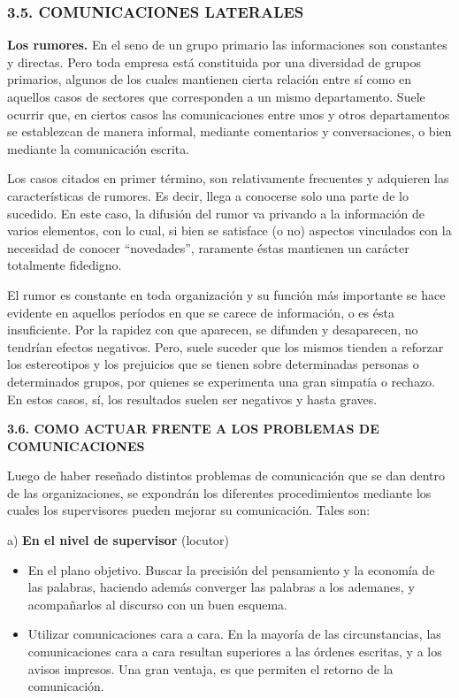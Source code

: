 
\subsubsection*{3.5. COMUNICACIONES LATERALES}
\textbf{Los rumores. }En el seno de un grupo primario las informaciones son constantes y directas. Pero toda empresa está constituida por una diversidad de grupos primarios, algunos de los cuales mantienen cierta relación entre sí como en aquellos casos de sectores que corresponden a un mismo departamento. Suele ocurrir que, en ciertos casos las comunicaciones entre unos y otros departamentos se establezcan de manera informal, mediante comentarios y conversaciones, o bien mediante la comunicación escrita.

Los casos citados en primer término, son relativamente frecuentes y adquieren las características de rumores. Es decir, llega a conocerse solo una parte de lo sucedido. En este caso, la difusión del rumor va privando a la información de varios elementos, con lo cual, si bien se satisface (o no) aspectos vinculados con la necesidad de conocer “novedades”, raramente éstas mantienen un carácter totalmente fidedigno.

El rumor es constante en toda organización y su función más importante se hace evidente en aquellos períodos en que se carece de información, o es ésta insuficiente. Por la rapidez con que aparecen, se difunden y desaparecen, no tendrían efectos negativos. Pero, suele suceder que los mismos tienden a reforzar los estereotipos y los prejuicios que se tienen sobre determinadas personas o determinados grupos, por quienes se experimenta una gran simpatía o rechazo. En estos casos, sí, los resultados suelen ser negativos y hasta graves.

\textbf{3.6. COMO ACTUAR FRENTE A LOS PROBLEMAS DE COMUNICACIONES}

Luego de haber reseñado distintos problemas de comunicación que se dan dentro de las organizaciones, se expondrán los diferentes procedimientos mediante los cuales los supervisores pueden mejorar su comunicación. Tales son:

a) \textbf{En el nivel de supervisor }(locutor)

\begin{itemize}
  \item En el plano objetivo. Buscar la precisión del pensamiento y la economía de las palabras, haciendo además converger las palabras a los ademanes, y acompañarlos al discurso con un buen esquema.
  \item Utilizar comunicaciones cara a cara. En la mayoría de las circunstancias, las comunicaciones cara a cara resultan superiores a las órdenes escritas, y a los avisos impresos. Una gran ventaja, es que permiten el retorno de la comunicación.
\end{itemize}

